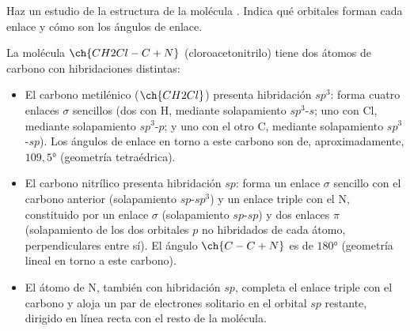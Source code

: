 \begin{exercise}
    Haz un estudio de la estructura de la molécula
    . Indica qué orbitales forman cada enlace y
    cómo son los ángulos de enlace.
    \begin{solu}
        La molécula \(\ch{CH2Cl-C+N}\) (cloroacetonitrilo) tiene dos átomos de carbono con hibridaciones distintas:

        \begin{itemize}
            \item El carbono metilénico (\(\ch{CH2Cl}\)) presenta hibridación \(sp^3\): forma cuatro enlaces \(\sigma\) sencillos (dos con H, mediante solapamiento \(sp^3\)-\(s\); uno con Cl, mediante solapamiento \(sp^3\)-\(p\); y uno con el otro C, mediante solapamiento \(sp^3\)-\(sp\)). Los ángulos de enlace en torno a este carbono son de, aproximadamente, \(109{,}5°\) (geometría tetraédrica).
            \item El carbono nitrílico presenta hibridación \(sp\): forma un enlace \(\sigma\) sencillo con el carbono anterior (solapamiento \(sp\)-\(sp^3\)) y un enlace triple con el N, constituido por un enlace \(\sigma\) (solapamiento \(sp\)-\(sp\)) y dos enlaces \(\pi\) (solapamiento de los dos orbitales \(p\) no hibridados de cada átomo, perpendiculares entre sí). El ángulo \(\ch{C-C+N}\) es de \(180°\) (geometría lineal en torno a este carbono).
            \item El átomo de N, también con hibridación \(sp\), completa el enlace triple con el carbono y aloja un par de electrones solitario en el orbital \(sp\) restante, dirigido en línea recta con el resto de la molécula.
        \end{itemize}
    \end{solu}
\end{exercise}


